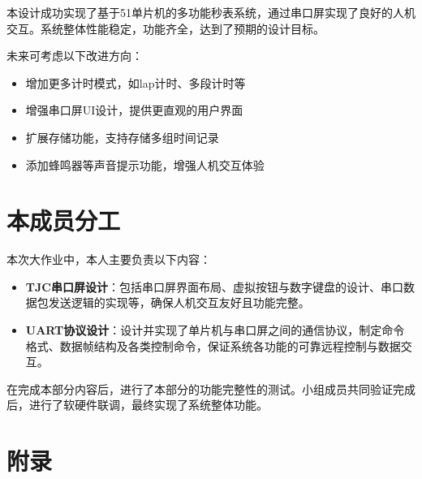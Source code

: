 \documentclass[12pt,hyperref,a4paper,UTF8]{ctexart}
\begin{document}
本设计成功实现了基于51单片机的多功能秒表系统，通过串口屏实现了良好的人机交互。系统整体性能稳定，功能齐全，达到了预期的设计目标。

未来可考虑以下改进方向：
\begin{itemize}
  \item 增加更多计时模式，如lap计时、多段计时等
  \item 增强串口屏UI设计，提供更直观的用户界面
  \item 扩展存储功能，支持存储多组时间记录
  \item 添加蜂鸣器等声音提示功能，增强人机交互体验
\end{itemize}

\section{本成员分工}

本次大作业中，本人主要负责以下内容：

\begin{itemize}
  \item \textbf{TJC串口屏设计}：包括串口屏界面布局、虚拟按钮与数字键盘的设计、串口数据包发送逻辑的实现等，确保人机交互友好且功能完整。
  \item \textbf{UART协议设计}：设计并实现了单片机与串口屏之间的通信协议，制定命令格式、数据帧结构及各类控制命令，保证系统各功能的可靠远程控制与数据交互。
\end{itemize}

在完成本部分内容后，进行了本部分的功能完整性的测试。小组成员共同验证完成后，进行了软硬件联调，最终实现了系统整体功能。

\section*{附录}
\end{document}
